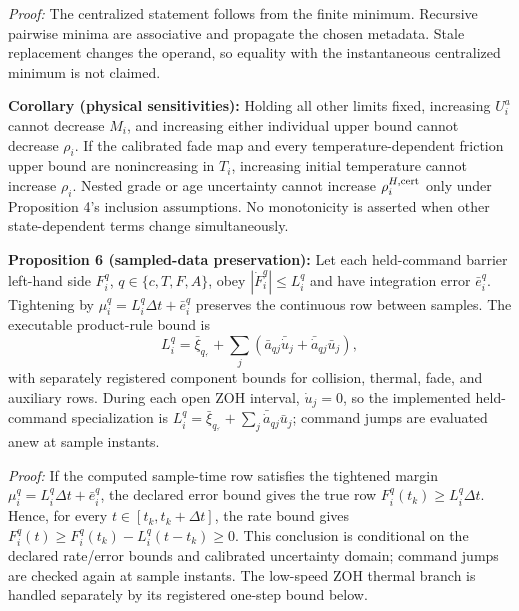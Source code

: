 \emph{Proof:} The centralized statement follows from the finite minimum. Recursive pairwise minima are associative and propagate the chosen metadata. Stale replacement changes the operand, so equality with the instantaneous centralized minimum is not claimed.

\textbf{Corollary (physical sensitivities):} Holding all other limits fixed, increasing $U_i^a$ cannot decrease $M_i$, and increasing either individual upper bound cannot decrease $\rho_i$. If the calibrated fade map and every temperature-dependent friction upper bound are nonincreasing in $T_i$, increasing initial temperature cannot increase $\rho_i$. Nested grade or age uncertainty cannot increase $\rho_i^{H,{\rm cert}}$ only under Proposition 4's inclusion assumptions. No monotonicity is asserted when other state-dependent terms change simultaneously.

\textbf{Proposition 6 (sampled-data preservation):} Let each held-command barrier left-hand side $F_i^q$, $q\in\{c,T,F,A\}$, obey $|\dot F_i^q|\le L_i^q$ and have integration error $\bar e_i^q$. Tightening by $\mu_i^q=L_i^q\Delta t+\bar e_i^q$ preserves the continuous row between samples. The executable product-rule bound is
\begin{equation}\label{eq:ratebound}
L_i^q=\bar\xi_{q,\dot{}}+\sum_j(\bar a_{qj}\bar{\dot u}_j+\bar{\dot a}_{qj}\bar u_j),
\end{equation}
with separately registered component bounds for collision, thermal, fade, and auxiliary rows. During each open ZOH interval, $\dot u_j=0$, so the implemented held-command specialization is $L_i^q=\bar\xi_{q,\dot{}}+\sum_j\bar{\dot a}_{qj}\bar u_j$; command jumps are evaluated anew at sample instants.

\emph{Proof:} If the computed sample-time row satisfies the tightened margin $\mu_i^q=L_i^q\Delta t+\bar e_i^q$, the declared error bound gives the true row $F_i^q(t_k)\ge L_i^q\Delta t$. Hence, for every $t\in[t_k,t_k+\Delta t]$, the rate bound gives $F_i^q(t)\ge F_i^q(t_k)-L_i^q(t-t_k)\ge0$. This conclusion is conditional on the declared rate/error bounds and calibrated uncertainty domain; command jumps are checked again at sample instants. The low-speed ZOH thermal branch is handled separately by its registered one-step bound below.

